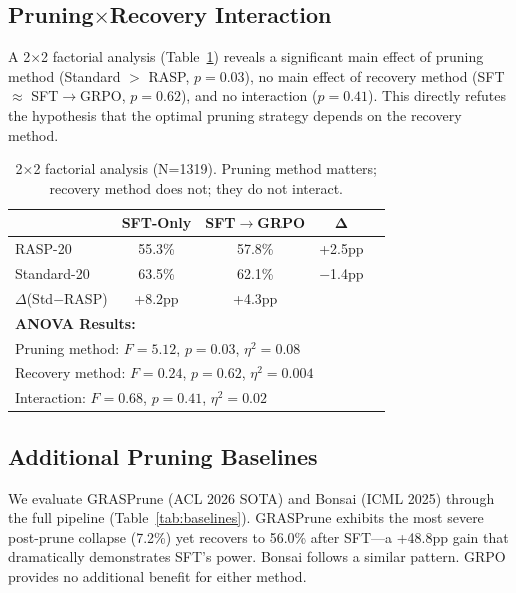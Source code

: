 \documentclass[11pt,a4paper]{article}
\begin{document}
\subsection{Pruning$\times$Recovery Interaction}
\label{sec:interaction}

A 2$\times$2 factorial analysis (Table~\ref{tab:anova}) reveals a significant main effect of pruning method (Standard $>$ RASP, $p{=}0.03$), no main effect of recovery method (SFT $\approx$ SFT$\to$GRPO, $p{=}0.62$), and no interaction ($p{=}0.41$). This directly refutes the hypothesis that the optimal pruning strategy depends on the recovery method.

\begin{table}[t]
\centering
\small
\begin{tabular}{@{}lcccc@{}}
\toprule
& \textbf{SFT-Only} & \textbf{SFT$\to$GRPO} & $\boldsymbol{\Delta}$ \\
\midrule
RASP-20 & 55.3\% & 57.8\% & +2.5pp \\
Standard-20 & 63.5\% & 62.1\% & $-$1.4pp \\
$\Delta$(Std$-$RASP) & +8.2pp & +4.3pp & \\
\midrule
\multicolumn{4}{l}{\textbf{ANOVA Results:}} \\
\multicolumn{4}{l}{Pruning method: $F{=}5.12$, $p{=}0.03$, $\eta^2{=}0.08$} \\
\multicolumn{4}{l}{Recovery method: $F{=}0.24$, $p{=}0.62$, $\eta^2{=}0.004$} \\
\multicolumn{4}{l}{Interaction: $F{=}0.68$, $p{=}0.41$, $\eta^2{=}0.02$} \\
\bottomrule
\end{tabular}
\caption{2$\times$2 factorial analysis (N=1319). Pruning method matters; recovery method does not; they do not interact.}
\label{tab:anova}
\end{table}


\subsection{Additional Pruning Baselines}
\label{sec:baselines}

We evaluate GRASPrune (ACL 2026 SOTA) and Bonsai (ICML 2025) through the full pipeline (Table~\ref{tab:baselines}). GRASPrune exhibits the most severe post-prune collapse (7.2\%) yet recovers to 56.0\% after SFT---a +48.8pp gain that dramatically demonstrates SFT's power. Bonsai follows a similar pattern. GRPO provides no additional benefit for either method.
\end{document}
